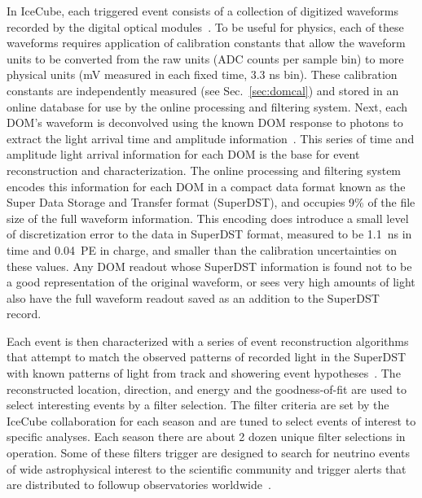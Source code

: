 In IceCube, each triggered event consists of a collection of digitized waveforms recorded by the digital optical modules~\cite{ref:domdaq}.
To be useful for physics, each of these waveforms requires application of calibration constants that allow the waveform units
to be converted from the raw units (ADC counts per sample bin) to more physical units (mV measured in each fixed time, 3.3 ns bin).  These
calibration constants are independently measured (see Sec.~\ref{sec:domcal}) and stored in an online database for use by
the online processing and filtering system.  Next, each DOM's waveform is deconvolved using the known DOM response
to photons to extract the light arrival time and amplitude information~\cite{IC3:ereco}.  
This series of time and amplitude light arrival information
for each DOM is the base for event reconstruction and characterization.  The online processing and filtering system encodes
this information for each DOM in a compact data format known as the
Super Data Storage and Transfer format (SuperDST), and occupies 9\%  of the file size
of the full waveform information.  This encoding does introduce a small level of discretization error to the
data in SuperDST format, measured to be 1.1~ns in time and 0.04~PE in charge, and smaller than the calibration
uncertainties on these values.  Any DOM readout whose SuperDST information is found not to be a good representation of the
original waveform, or sees very high amounts of light also have the full waveform readout saved as an addition to the SuperDST record.


Each event is then characterized with a series of event reconstruction algorithms that attempt to match
the observed patterns of recorded light in the SuperDST with known patterns of light
from track and showering event hypotheses~\cite{IC3:ereco}.  The
reconstructed location, direction, and energy and the goodness-of-fit are used to select interesting
events by a filter selection.  The filter criteria are set by the IceCube collaboration for each season
and are tuned to select events of interest to specific analyses.  Each season there are
about 2 dozen unique filter selections in operation.  Some of these filters trigger are
designed to search for neutrino events of wide astrophysical interest to the scientific community and trigger
alerts that are distributed to followup observatories worldwide~\cite{Abbasi:2011ja,Aartsen:2015trq}.

